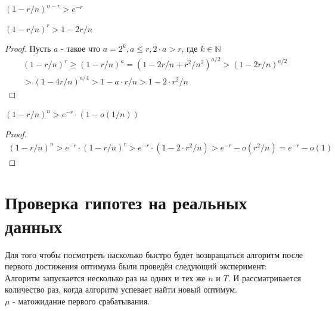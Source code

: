 \documentclass[times]{itmo-student-thesis}
\begin{document}
    \begin{lemma}
        \label{exp:greater}
        $(1 - r/n)^{n - r} > e^{-r}$
    \end{lemma}

    \begin{lemma}
        \label{exp:greater2}
        $(1 - r/n)^r > 1 - 2r/n$
    \end{lemma}
    \begin{proof}
        Пусть $a$ - такое что $a = 2^k, a \leq r, 2\cdot a  > r$, где $k \in \mathbb {N}$ \\
        \begin{gather*}
        (1 - r/n)^r \geq (1 - r/n)^a = (1 - 2r/n + r^2/n^2)^{a/2} > (1 - 2r/n)^{a/2} \\
        > (1 - 4r/n)^{a/4} > 1 - a\cdot r/n > 1 - 2\cdot r^2/n
        \end{gather*}
    \end{proof}

    \begin{lemma}
        \label{exp:greaterO}
        $(1 - r/n)^n > e^{-r} \cdot (1 - o(1/n))$
    \end{lemma}
    \begin{proof}
        \begin{gather*}
        (1 - r/n)^n > e^{-r} \cdot (1 - r/n)^r > e^{-r} \cdot (1 - 2 \cdot r^2/n) > e^{-r} - o(r^2/n) = e^{-r} - o(1)
        \end{gather*}
    \end{proof}


    \chapter{Проверка гипотез на реальных данных}\label{ch:проверка-гипотез}


    Для того чтобы посмотреть насколько быстро будет возвращаться алгоритм после первого достижения оптимума были проведён следующий эксперимент: \\
    Алгоритм запускается несколько раз на одних и тех же $n$ и $T$.
    И рассматривается количество раз, когда алгоритм успевает найти новый оптимум. \\
    $\mu$ - матожидание первого срабатывания.
\end{document}
